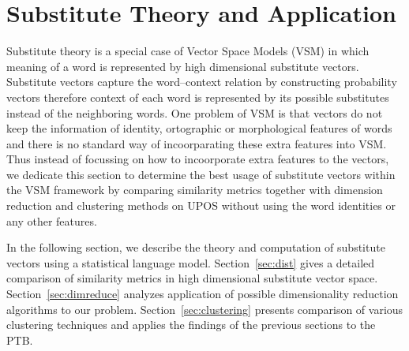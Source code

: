 \section{Substitute Theory and Application}
\label{sec:subthr}

Substitute theory is a special case of Vector Space Models (VSM)
\cite{DBLP:journals/jair/TurneyP10} in which meaning of a word is
represented by high dimensional substitute vectors.  Substitute
vectors capture the word--context relation by constructing probability
vectors therefore context of each word is represented by its possible
substitutes instead of the neighboring words.  One problem of VSM is
that vectors do not keep the information of identity, ortographic or
morphological features of words and there is no standard way of
incoorparating these extra features into VSM.  Thus instead of
focussing on how to incoorporate extra features to the vectors, we
dedicate this section to determine the best usage of substitute
vectors within the VSM framework by comparing similarity metrics
together with dimension reduction and clustering methods on UPOS
without using the word identities or any other features.





In the following section, we describe the theory and computation of
substitute vectors using a statistical language model.
Section~\ref{sec:dist} gives a detailed comparison of similarity
metrics in high dimensional substitute vector space.
Section~\ref{sec:dimreduce} analyzes application of possible
dimensionality reduction algorithms to our problem.
Section~\ref{sec:clustering} presents comparison of various clustering
techniques and applies the findings of the previous sections to the
PTB.

